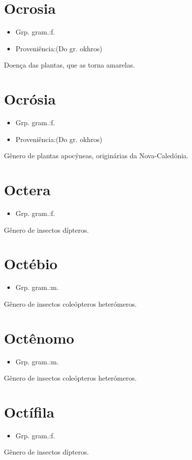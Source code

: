 \section{Ocrosia}
\begin{itemize}
\item {Grp. gram.:f.}
\end{itemize}
\begin{itemize}
\item {Proveniência:(Do gr. \textunderscore okhros\textunderscore )}
\end{itemize}
Doença das plantas, que as torna amarelas.
\section{Ocrósia}
\begin{itemize}
\item {Grp. gram.:f.}
\end{itemize}
\begin{itemize}
\item {Proveniência:(Do gr. \textunderscore okhros\textunderscore )}
\end{itemize}
Gênero de plantas apocýneas, originárias da Nova-Caledónia.
\section{Octera}
\begin{itemize}
\item {Grp. gram.:f.}
\end{itemize}
Gênero de insectos dípteros.
\section{Octébio}
\begin{itemize}
\item {Grp. gram.:m.}
\end{itemize}
Gênero de insectos coleópteros heterómeros.
\section{Octênomo}
\begin{itemize}
\item {Grp. gram.:m.}
\end{itemize}
Gênero de insectos coleópteros heterómeros.
\section{Octífila}
\begin{itemize}
\item {Grp. gram.:f.}
\end{itemize}
Gênero de insectos dípteros.
